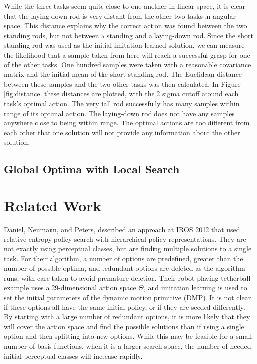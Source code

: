 \documentclass[12pt]{article}
\newcommand{\appsp}  {\ensuremath{\Theta}}
\begin{document}
\newpage
While the three tasks seem quite close to one another in linear space, it is clear that the laying-down rod is very distant from the other two tasks in angular space. This distance explains why the correct action was found between the two standing rods, but not between a standing and a laying-down rod. Since the short standing rod was used as the initial imitation-learned solution, we can measure the likelihood that a sample taken from here will reach a successful grasp for one of the other tasks. One hundred samples were taken with a reasonable covariance matrix and the initial mean of the short standing rod. The Euclidean distance between these samples and the two other tasks was then calculated. In Figure \ref{fig:distance} these distances are plotted, with the 2 sigma cutoff around each task's optimal action. The very tall rod successfully has many samples within range of its optimal action. The laying-down rod does not have any samples anywhere close to being within range. The optimal actions are too different from each other that one solution will not provide any information about the other solution.

\subsection{Global Optima with Local Search}


\section{Related Work}

Daniel, Neumann, and Peters, described an approach at IROS 2012 \cite{daniel} that used relative entropy policy search with hierarchical policy representations. They are not exactly using perceptual classes, but are finding multiple solutions to a single task. For their algorithm, a number of options are predefined, greater than the number of possible optima, and redundant options are deleted as the algorithm runs, with care taken to avoid premature deletion. Their robot playing tetherball example uses a 29-dimensional action space $\appsp$, and imitation learning is used to set the initial parameters of the dynamic motion primitive (DMP). It is not clear if these options all have the same initial policy, or if they are seeded differently. By starting with a large number of redundant options, it is more likely that they will cover the action space and find the possible solutions than if using a single option and then splitting into new options. While this may be feasible for a small number of basis functions, when it is a larger search space, the number of needed initial perceptual classes will increase rapidly. 
\end{document}

